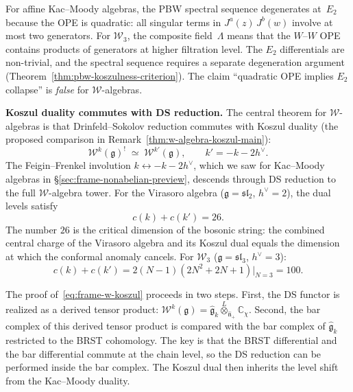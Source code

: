 \begin{remark}
\label{rem:frame-pbw-warning}
For affine Kac--Moody algebras, the PBW spectral sequence degenerates
at~$E_2$ because the OPE is quadratic: all singular terms in
$J^a(z)\,J^b(w)$ involve at most two generators.  For $\mathcal{W}_3$,
the composite field~$\Lambda$ means that the $W$--$W$ OPE contains
products of generators at higher filtration level.  The $E_2$
differentials are non-trivial, and the spectral sequence requires
a separate degeneration argument
(Theorem~\ref{thm:pbw-koszulness-criterion}).  The claim ``quadratic
OPE implies $E_2$ collapse'' is \emph{false} for $\mathcal{W}$-algebras.
\end{remark}

\medskip
\noindent\textbf{Koszul duality commutes with DS reduction.}
The central theorem for $\mathcal{W}$-algebras is that Drinfeld--Sokolov
reduction commutes with Koszul duality
(the proposed comparison in Remark~\ref{thm:w-algebra-koszul-main}):
\begin{equation}\label{eq:frame-w-koszul}
\mathcal{W}^k(\mathfrak{g})^!
\;\simeq\;
\mathcal{W}^{k'}(\mathfrak{g}),
\qquad
k' = -k - 2h^\vee.
\end{equation}
The Feigin--Frenkel involution $k \leftrightarrow -k - 2h^\vee$,
which we saw for Kac--Moody algebras in
\S\ref{sec:frame-nonabelian-preview}, descends through DS reduction
to the full $\mathcal{W}$-algebra tower.  For the Virasoro algebra
($\mathfrak{g} = \mathfrak{sl}_2$, $h^\vee = 2$), the dual levels
satisfy
\begin{equation}\label{eq:frame-virasoro-dual-central-charge}
c(k) + c(k') = 26.
\end{equation}
The number $26$ is the critical dimension of the bosonic string:
the combined central charge of the Virasoro algebra and its Koszul
dual equals the dimension at which the conformal anomaly cancels.
For $\mathcal{W}_3$ ($\mathfrak{g} = \mathfrak{sl}_3$,
$h^\vee = 3$):
\begin{equation}\label{eq:frame-w3-dual-central-charge}
c(k) + c(k') = 2(N{-}1)(2N^2{+}2N{+}1)\big|_{N=3} = 100.
\end{equation}

The proof of~\eqref{eq:frame-w-koszul} proceeds in two steps.
First, the DS functor is realized as a derived tensor product:
$\mathcal{W}^k(\mathfrak{g}) = \widehat{\mathfrak{g}}_k
\overset{L}{\otimes}_{\widehat{\mathfrak{n}}_+} \mathbb{C}_\chi$.
Second, the bar complex of this derived tensor product is compared
with the bar complex of $\widehat{\mathfrak{g}}_k$ restricted to
the BRST cohomology.  The key is that the BRST differential and the
bar differential commute at the chain level, so the DS reduction
can be performed inside the bar complex.  The Koszul dual then
inherits the level shift from the Kac--Moody duality.

